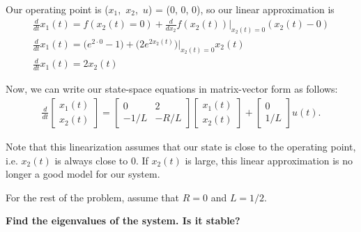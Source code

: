 \begin{enumerate}
{        Our operating point is ($x_1$,\, $x_2$,\, $u$) = ($0$, $0$, $0$), so our linear approximation is
        \begin{align*}
            \frac{d}{dt} x_1(t) = f(x_2(t) = 0) + \frac{d}{d x_2} f(x_2(t))\bigg\rvert_{x_2(t) = 0} (x_2(t) - 0) \\
            \frac{d}{dt} x_1(t) = \big(e^{2 \cdot 0} - 1\big) + \big(2e^{2x_2(t)}\big)\bigg\rvert_{x_2(t) = 0} x_2(t) \\
            \frac{d}{dt} x_1(t) = 2x_2(t)
        \end{align*}

        Now, we can write our state-space equations in matrix-vector form as follows:
        \begin{align*}
            \frac{d}{dt} \begin{bmatrix}
                x_1(t) \\ x_2(t)
            \end{bmatrix} =
            \begin{bmatrix}
                0 & 2 \\
                -1/L & -R/L
            \end{bmatrix} \begin{bmatrix}
                x_1(t) \\ x_2(t)
            \end{bmatrix} +
            \begin{bmatrix}
                0 \\ 1/L
            \end{bmatrix} u(t).
        \end{align*}

        Note that this linearization assumes that our state is close to the operating point, i.e. $x_2(t)$ is always close to 0. If $x_2(t)$ is large, this linear approximation is no longer a good model for our system.
    }

    \qitem For the rest of the problem, assume that $R = 0$ and $L = 1/2$.

    \textbf{Find the eigenvalues of the system. Is it stable?}



\end{enumerate}
